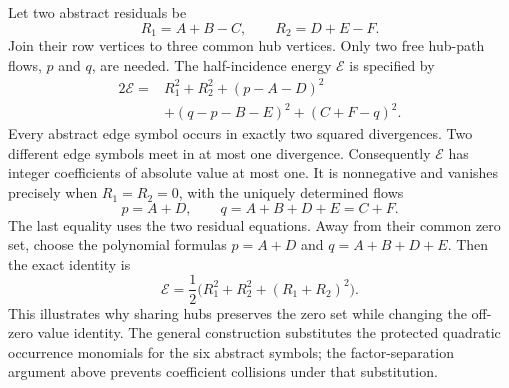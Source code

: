 Let two abstract residuals be
\[
 R_1=A+B-C,\qquad R_2=D+E-F.
\]
Join their row vertices to three common hub vertices. Only two free
hub-path flows, $p$ and $q$, are needed. The half-incidence energy $\mathcal E$
is specified by
\begin{align*}
 2\mathcal E={}&R_1^2+R_2^2+(p-A-D)^2\\
              &+(q-p-B-E)^2+(C+F-q)^2.
\end{align*}
Every abstract edge symbol occurs in exactly two squared divergences.
Two different edge symbols meet in at most one divergence. Consequently
$\mathcal E$ has integer coefficients of absolute value at most one.
It is nonnegative and vanishes precisely when $R_1=R_2=0$, with the
uniquely determined flows
\[
 p=A+D,\qquad q=A+B+D+E=C+F.
\]
The last equality uses the two residual equations. Away from their
common zero set, choose the polynomial formulas
$p=A+D$ and $q=A+B+D+E$. Then the exact identity is
\[
 \mathcal E=\frac12\bigl(R_1^2+R_2^2+(R_1+R_2)^2\bigr).
\]
This illustrates why sharing hubs preserves the zero set while changing
the off-zero value identity. The general construction substitutes the
protected quadratic occurrence monomials for the six abstract symbols;
the factor-separation argument above prevents coefficient collisions
under that substitution.
